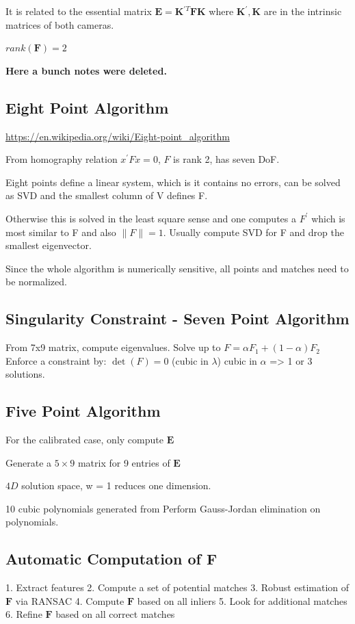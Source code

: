 \begin{enumerate}
It is related to the essential matrix $\mathbf{E} = \mathbf{K}^{\prime T} \mathbf{FK}$ where $\mathbf{K}^{\prime}, \mathbf{K}$ are in the intrinsic matrices of both cameras.

$rank(\mathbf{F}) = 2$

\textbf{Here a bunch notes were deleted.}

\subsection{Eight Point Algorithm}

\url{https://en.wikipedia.org/wiki/Eight-point_algorithm}

From homography relation $x^\prime F x = 0$, $F$ is rank 2, has seven DoF. 

Eight points define a linear system, which is it contains no errors, can be solved as SVD and the smallest column of V defines F.

Otherwise this is solved in the least square sense and one computes a $F^\prime$ which is most similar to F and also $\|F\|=1$. Usually compute SVD for F and drop the smallest eigenvector. 

Since the whole algorithm is numerically sensitive, all points and matches need to be normalized. 

\subsection{Singularity Constraint - Seven Point Algorithm}
From 7x9 matrix, compute eigenvalues.
Solve up to $F = \alpha F_1 + (1-\alpha) F_2$
Enforce a constraint by: $\det(F) = 0$ (cubic in $\lambda$)
cubic in $\alpha$ => 1 or 3 solutions.

\subsection{Five Point Algorithm}

For the calibrated case, only compute $\mathbf{E}$

Generate a $5\times9$ matrix for 9 entries of $\mathbf{E}$

$4D$ solution space, w = 1 reduces one dimension.

10 cubic polynomials generated from 
Perform Gauss-Jordan elimination on polynomials.

\subsection{Automatic Computation of $\mathbf{F}$}
1. Extract features
2. Compute a set of potential matches
3. Robust estimation of $\mathbf{F}$ via RANSAC  
4. Compute $\mathbf{F}$ based on all inliers
5. Look for additional matches
6. Refine $\mathbf{F}$ based on all correct matches


\end{enumerate}
